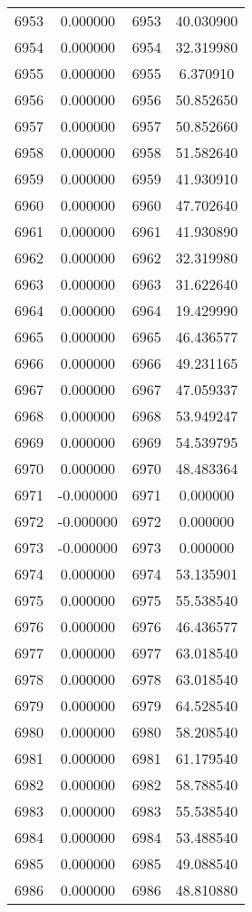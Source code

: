 \documentclass[12pt]{article}
\begin{document}
\begin{longtable}{@{}cccc@{}}
6953 & 0.000000 & 6953 & 40.030900 \\
6954 & 0.000000 & 6954 & 32.319980 \\
6955 & 0.000000 & 6955 & 6.370910 \\
6956 & 0.000000 & 6956 & 50.852650 \\
6957 & 0.000000 & 6957 & 50.852660 \\
6958 & 0.000000 & 6958 & 51.582640 \\
6959 & 0.000000 & 6959 & 41.930910 \\
6960 & 0.000000 & 6960 & 47.702640 \\
6961 & 0.000000 & 6961 & 41.930890 \\
6962 & 0.000000 & 6962 & 32.319980 \\
6963 & 0.000000 & 6963 & 31.622640 \\
6964 & 0.000000 & 6964 & 19.429990 \\
6965 & 0.000000 & 6965 & 46.436577 \\
6966 & 0.000000 & 6966 & 49.231165 \\
6967 & 0.000000 & 6967 & 47.059337 \\
6968 & 0.000000 & 6968 & 53.949247 \\
6969 & 0.000000 & 6969 & 54.539795 \\
6970 & 0.000000 & 6970 & 48.483364 \\
6971 & -0.000000 & 6971 & 0.000000 \\
6972 & -0.000000 & 6972 & 0.000000 \\
6973 & -0.000000 & 6973 & 0.000000 \\
6974 & 0.000000 & 6974 & 53.135901 \\
6975 & 0.000000 & 6975 & 55.538540 \\
6976 & 0.000000 & 6976 & 46.436577 \\
6977 & 0.000000 & 6977 & 63.018540 \\
6978 & 0.000000 & 6978 & 63.018540 \\
6979 & 0.000000 & 6979 & 64.528540 \\
6980 & 0.000000 & 6980 & 58.208540 \\
6981 & 0.000000 & 6981 & 61.179540 \\
6982 & 0.000000 & 6982 & 58.788540 \\
6983 & 0.000000 & 6983 & 55.538540 \\
6984 & 0.000000 & 6984 & 53.488540 \\
6985 & 0.000000 & 6985 & 49.088540 \\
6986 & 0.000000 & 6986 & 48.810880 \\

\end{longtable}
\end{document}
